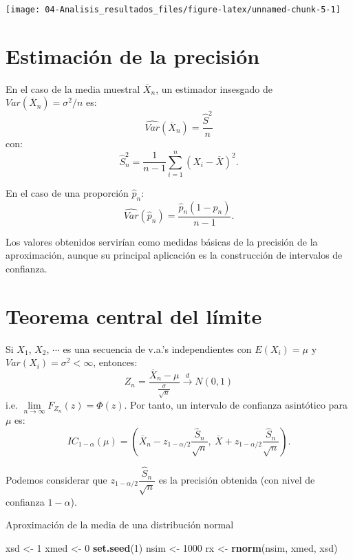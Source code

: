 \documentclass[]{book}
\newenvironment{Shaded}{\begin{snugshade}}{\end{snugshade}}
\newcommand{\KeywordTok}[1]{\textcolor[rgb]{0.13,0.29,0.53}{\textbf{#1}}}
\newcommand{\DecValTok}[1]{\textcolor[rgb]{0.00,0.00,0.81}{#1}}
\newcommand{\StringTok}[1]{\textcolor[rgb]{0.31,0.60,0.02}{#1}}
\newcommand{\NormalTok}[1]{#1}
\theoremstyle{definition}
\theoremstyle{definition}
\theoremstyle{definition}
\theoremstyle{remark}
\let\BeginKnitrBlock\begin \let\EndKnitrBlock\end
\begin{document}
\begin{center}\texttt{[image: 04-Analisis\_resultados\_files/figure-latex/unnamed-chunk-5-1]} \end{center}

\section{Estimación de la precisión}\label{estimacion-de-la-precision}

En el caso de la media muestral \(\overline{X}_{n}\), un estimador
insesgado de \(Var\left( \overline{X}_{n}\right) =\sigma ^{2}/n\) es:
\[\widehat{Var}\left( \overline{X}_{n}\right) =\frac{\widehat{S}^{2}}{n}\]
con:
\[\widehat{S}_{n}^{2}=\dfrac{1}{n-1}\sum\limits_{i=1}^{n}\left( X_{i}-
\overline{X}\right) ^{2}.\]

En el caso de una proporción \(\hat{p}_{n}\):
\[\widehat{Var}\left( \hat{p}_{n}\right) 
=\frac{\hat{p}_{n}(1-\hat{p}_{n})}{n-1}.\]

Los valores obtenidos servirían como medidas básicas de la precisión de
la aproximación, aunque su principal aplicación es la construcción de
intervalos de confianza.

\section{Teorema central del límite}\label{teorema-central-del-limite}

Si \(X_{1}\), \(X_{2}\), \(\cdots\) es una secuencia de v.a.'s
independientes con \(E\left( X_{i}\right) =\mu\) y
\(Var\left( X_{i}\right) = \sigma ^{2}<\infty\), entonces:
\[Z_{n}=\frac{\overline{X}_{n}-\mu }{\frac{\sigma }{\sqrt{n}}}
\overset{d}{ \rightarrow } N(0,1)\] i.e.
\(\lim\limits_{n\rightarrow \infty }F_{Z_{n}}(z)=\Phi (z)\). Por tanto,
un intervalo de confianza asintótico para \(\mu\) es:
\[IC_{1-\alpha }(\mu ) = \left( \overline{X}_{n}
- z_{1-\alpha /2}\dfrac{\widehat{S}_{n}}{\sqrt{n}},\ 
\overline{X}+z_{1-\alpha /2}\dfrac{\widehat{S}_{n}}{\sqrt{n}} \right).\]

Podemos considerar que
\(z_{1-\alpha /2}\dfrac{\widehat{S}_{n}}{\sqrt{n}}\) es la precisión
obtenida (con nivel de confianza \(1-\alpha\)).

\BeginKnitrBlock{example}
\protect\hypertarget{exm:unnamed-chunk-6}{}{\label{exm:unnamed-chunk-6}
}Aproximación de la media de una distribución normal
\EndKnitrBlock{example}

\begin{Shaded}
\begin{Highlighting}[]
\NormalTok{xsd <-}\StringTok{ }\DecValTok{1}
\NormalTok{xmed <-}\StringTok{ }\DecValTok{0}
\KeywordTok{set.seed}\NormalTok{(}\DecValTok{1}\NormalTok{)}
\NormalTok{nsim <-}\StringTok{ }\DecValTok{1000}
\NormalTok{rx <-}\StringTok{ }\KeywordTok{rnorm}\NormalTok{(nsim, xmed, xsd)}
\end{Highlighting}
\end{Shaded}
\end{document}
